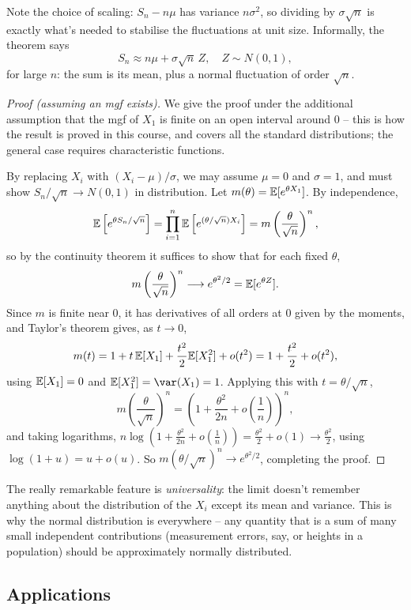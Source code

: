 \documentclass[a4paper]{scrartcl}
\begin{document}
Note the choice of scaling: $S_n - n\mu$ has variance $n\sigma^2$, so dividing by $\sigma\sqrt{n}$ is exactly what's needed to stabilise the fluctuations at unit size. Informally, the theorem says
$$
S_n \approx n\mu + \sigma\sqrt{n}\, Z, \quad Z \sim N(0, 1),
$$
for large $n$: the sum is its mean, plus a normal fluctuation of order $\sqrt{n}$.

\begin{proof}[Proof (assuming an mgf exists)]
	We give the proof under the additional assumption that the mgf of $X_1$ is finite on an open interval around $0$ -- this is how the result is proved in this course, and covers all the standard distributions; the general case requires characteristic functions.

	By replacing $X_i$ with $(X_i - \mu)/\sigma$, we may assume $\mu = 0$ and $\sigma = 1$, and must show $S_n/\sqrt{n} \rightarrow N(0, 1)$ in distribution. Let $m(\theta) = \mathbb{E}[e^{\theta X_1}]$. By independence,
	$$
	\mathbb{E}\left[e^{\theta S_n / \sqrt{n}}\right] = \prod_{i = 1}^{n}\mathbb{E}\left[e^{(\theta/\sqrt{n})X_i}\right] = m\left(\frac{\theta}{\sqrt{n}}\right)^{n},
	$$
	so by the continuity theorem it suffices to show that for each fixed $\theta$,
	$$
	m\left(\frac{\theta}{\sqrt{n}}\right)^{n} \longrightarrow e^{\theta^2/2} = \mathbb{E}[e^{\theta Z}].
	$$
	Since $m$ is finite near $0$, it has derivatives of all orders at $0$ given by the moments, and Taylor's theorem gives, as $t \rightarrow 0$,
	$$
	m(t) = 1 + t\,\mathbb{E}[X_1] + \frac{t^2}{2}\mathbb{E}[X_1^2] + o(t^2) = 1 + \frac{t^2}{2} + o(t^2),
	$$
	using $\mathbb{E}[X_1] = 0$ and $\EE[X_1^2] = \var(X_1) = 1$. Applying this with $t = \theta/\sqrt{n}$,
	$$
	m\left(\frac{\theta}{\sqrt{n}}\right)^n = \left(1 + \frac{\theta^2}{2n} + o\left(\frac1n\right)\right)^{n},
	$$
	and taking logarithms, $n \log\left(1 + \frac{\theta^2}{2n} + o(\frac1n)\right) = \frac{\theta^2}{2} + o(1) \rightarrow \frac{\theta^2}{2}$, using $\log(1 + u) = u + o(u)$. So $m(\theta/\sqrt{n})^n \rightarrow e^{\theta^2/2}$, completing the proof.
\end{proof}

The really remarkable feature is \emph{universality}: the limit doesn't remember anything about the distribution of the $X_i$ except its mean and variance. This is why the normal distribution is everywhere -- any quantity that is a sum of many small independent contributions (measurement errors, say, or heights in a population) should be approximately normally distributed.

\subsection{Applications}
\end{document}
